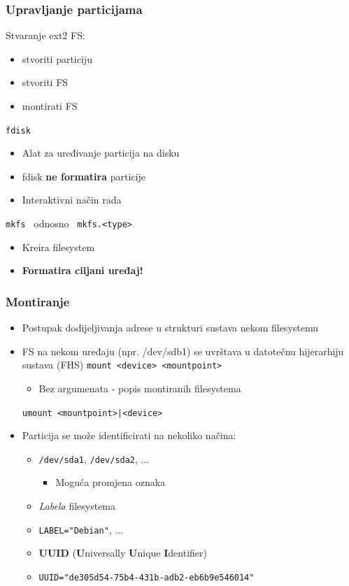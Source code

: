 \documentclass[t]{beamer}
\begin{document}
\begin{frame}[fragile]
	\frametitle{Upravljanje particijama}
    Stvaranje ext2 FS:
    \begin{itemize}
        \item stvoriti particiju
        \item stvoriti FS
        \item montirati FS
    \end{itemize}
	\vfill
	\texttt{fdisk}
	\begin{itemize}
		\item Alat za uređivanje particija na disku
		\item fdisk \textbf{ne formatira} particije
		\item Interaktivni način rada
	\end{itemize}
	\vfill
	\texttt{mkfs} \, odnosno \, \verb|mkfs.<type>|
	\begin{itemize}
		\item Kreira filesystem
		\item \textbf{Formatira ciljani uređaj!}
	\end{itemize}
\end{frame}



\begin{frame}[fragile]
	\frametitle{Montiranje}
	\begin{itemize}
		\item Postupak dodijeljivanja adrese u strukturi sustava nekom filesystemu
		\item FS na nekom uređaju (npr. /dev/sdb1) se uvrštava u datotečnu hijerarhiju sustava (FHS)
		\vfill
		\verb|mount <device> <mountpoint>|
		\begin{itemize}
			\item Bez argumenata - popis montiranih filesystema
		\end{itemize}
		\verb/umount <mountpoint>|<device>/
		\vfill
		\item Particija se može identificirati na nekoliko načina: 
		\begin{itemize}
			\item \verb|/dev/sda1|, \verb|/dev/sda2|, ...
			\begin{itemize}
				\item Moguća promjena oznaka
			\end{itemize}
			\item \textit{Labela} filesystema
			\item[] \verb|LABEL="Debian"|, ...
			\item \textbf{UUID} (\textbf{U}niversally \textbf{U}nique \textbf{I}dentifier)
			\item[] \verb|UUID="de305d54-75b4-431b-adb2-eb6b9e546014"|
		\end{itemize}
	\end{itemize}
\end{frame}
\end{document}

